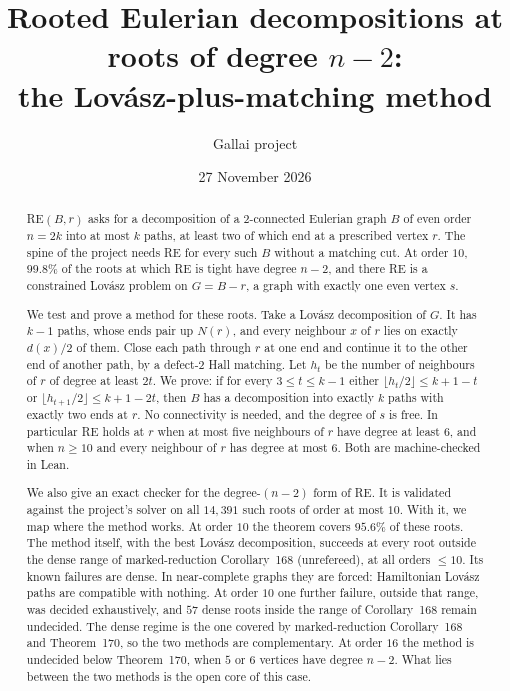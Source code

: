 \documentclass[11pt]{amsart}
\title[RE at roots of degree $n-2$]{Rooted Eulerian decompositions at roots of degree $n-2$:\\ the Lov\'asz-plus-matching method}
\author{Gallai project}
\date{27 November 2026}
\theoremstyle{definition}
\begin{document}
\sloppy

\begin{abstract}
RE$(B,r)$ asks for a decomposition of a $2$-connected Eulerian graph $B$ of even order $n=2k$ into
at most $k$ paths, at least two of which end at a prescribed vertex $r$. The spine of the project
needs RE for every such $B$ without a matching cut. At order $10$, $99.8\%$ of the roots at which RE
is tight have degree $n-2$, and there RE is a constrained Lov\'asz problem on $G=B-r$, a graph with
exactly one even vertex $s$.

We test and prove a method for these roots. Take a Lov\'asz decomposition of $G$. It has $k-1$
paths, whose ends pair up $N(r)$, and every neighbour $x$ of $r$ lies on exactly $d(x)/2$ of them.
Close each path through $r$ at one end and continue it to the other end of another path, by a
defect-$2$ Hall matching. Let $h_t$ be the number of neighbours of $r$ of degree at least $2t$. We
prove: if for every $3\le t\le k-1$ either $\lfloor h_t/2\rfloor\le k+1-t$ or
$\lfloor h_{t+1}/2\rfloor\le k+1-2t$, then $B$ has a decomposition into exactly $k$ paths with exactly
two ends at $r$. No connectivity is needed, and the degree of $s$ is free. In particular RE holds at
$r$ when at most five neighbours of $r$ have degree at least $6$, and when $n\ge 10$ and every
neighbour of $r$ has degree at most $6$. Both are machine-checked in Lean.

We also give an exact checker for the degree-$(n-2)$ form of RE. It is validated against the
project's solver on all $14{,}391$ such roots of order at most $10$. With it, we map where the method
works. At order $10$ the theorem covers $95.6\%$ of these roots. The method itself, with the best
Lov\'asz decomposition, succeeds at every root outside the dense range of
marked-reduction Corollary~168 (unrefereed), at all orders $\le10$. Its known failures are dense. In
near-complete graphs they are forced: Hamiltonian Lov\'asz paths are compatible with nothing. At order
$10$ one further failure, outside that range, was decided exhaustively, and $57$ dense roots inside
the range of Corollary~168 remain undecided. The dense regime is the one
covered by marked-reduction Corollary~168 and Theorem~170, so the two methods are complementary. At
order $16$ the method is undecided below Theorem~170, when $5$ or $6$ vertices have degree $n-2$.
What lies between the two methods is the open core of this case.
\end{abstract}

\maketitle
\end{document}
